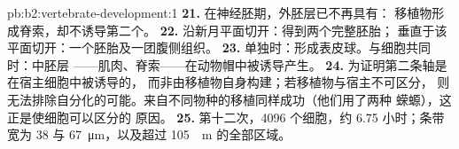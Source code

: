 \begin{solution}{pb:b2:vertebrate-development:1}
\textbf{21.} 在神经胚期，外胚层已不再具有：
移植物形成脊索，却不诱导第二个。
\textbf{22.} 沿新月平面切开：得到两个完整胚胎；
垂直于该平面切开：一个胚胎及一团腹侧组织。
\textbf{23.} 单独时：形成表皮球。与细胞共同时：中胚层
——肌肉、脊索——在动物帽中被诱导产生。
\textbf{24.} 为证明第二条轴是在宿主细胞中被诱导的，
而非由移植物自身构建；若移植物与宿主不可区分，
则无法排除自分化的可能。来自不同物种的移植同样成功（他们用了两种
蝾螈），这正是使细胞可以区分的
原因。
\textbf{25.} 第十二次，4096 个细胞，约 6.75 小时；条带
宽为 38 与 \qty{67}{\micro m}，以及超过 \qty{105}{\micro
m} 的全部区域。
\end{solution}
